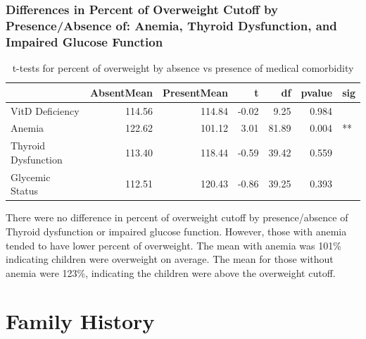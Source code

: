\documentclass[
]{article}
\begin{document}
\FloatBarrier

\hypertarget{differences-in-percent-of-overweight-cutoff-by-presenceabsence-of-anemia-thyroid-dysfunction-and-impaired-glucose-function}{%
\subsubsection{Differences in Percent of Overweight Cutoff by
Presence/Absence of: Anemia, Thyroid Dysfunction, and Impaired Glucose
Function}\label{differences-in-percent-of-overweight-cutoff-by-presenceabsence-of-anemia-thyroid-dysfunction-and-impaired-glucose-function}}

\begin{table}[!h]

\caption{\label{tab:IOTF_pOWcutoff_MedComorbid_ttests}t-tests for percent of overweight by absence vs presence of medical comorbidity}
\centering
\begin{tabular}[t]{lrrrrrl}
\toprule
  & AbsentMean & PresentMean & t & df & pvalue & sig\\
\midrule
VitD Deficiency & 114.56 & 114.84 & -0.02 & 9.25 & 0.984 & \\
Anemia & 122.62 & 101.12 & 3.01 & 81.89 & 0.004 & **\\
Thyroid Dysfunction & 113.40 & 118.44 & -0.59 & 39.42 & 0.559 & \\
Glycemic Status & 112.51 & 120.43 & -0.86 & 39.25 & 0.393 & \\
\bottomrule
\end{tabular}
\end{table}
\FloatBarrier

There were no difference in percent of overweight cutoff by
presence/absence of Thyroid dysfunction or impaired glucose function.
However, those with anemia tended to have lower percent of overweight.
The mean with anemia was 101\% indicating children were overweight on
average. The mean for those without anemia were 123\%, indicating the
children were above the overweight cutoff.

\FloatBarrier
\clearpage

\hypertarget{family-history}{%
\section{Family History}\label{family-history}}
\end{document}
